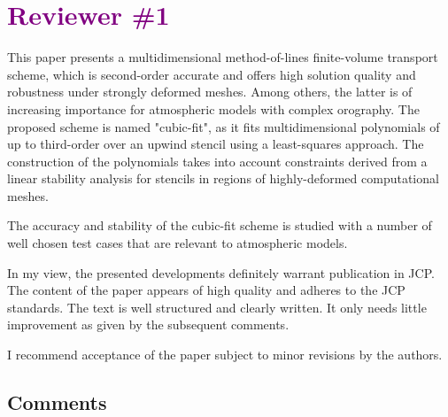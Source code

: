 \documentclass[times]{elsarticle}
\newcommand{\revone}[1]{\textcolor{purple}{\textbf{#1}}}
\newcommand{\revother}[1]{\textcolor{orange}{\textbf{#1}}}
\renewenvironment{abstract}{\global\setbox\absbox=\vbox\bgroup
\hsize=\textwidth\def\baselinestretch{1}%
\noindent\unskip\ignorespaces}
{\egroup}
\begin{document}

\section*{\revone{Reviewer \#1}}
This paper presents a multidimensional method-of-lines finite-volume transport scheme,
which is second-order accurate and offers high solution quality and robustness under
strongly deformed meshes. Among others, the latter is of increasing importance for 
atmospheric models with complex orography. The proposed scheme is named "cubic-fit", 
as it fits multidimensional polynomials of up to third-order over an upwind stencil
using a least-squares approach. The construction of the polynomials takes into account 
constraints derived from a linear stability analysis for stencils in regions of  
highly-deformed computational meshes.

The accuracy and stability of the cubic-fit scheme is studied with a number of well 
chosen test cases that are relevant to atmospheric models. 

In my view, the presented developments definitely warrant publication in JCP. 
The content of the paper appears of high quality and adheres to the JCP standards. 
The text is well structured and clearly written. It only needs little improvement 
as given by the subsequent comments. 

I recommend acceptance of the paper subject to minor revisions by the authors.

\subsection*{Comments}
\end{document}
